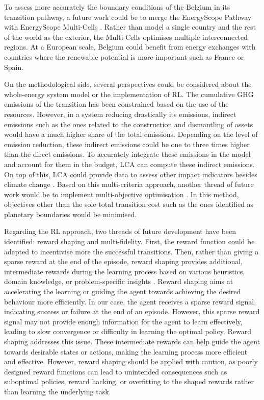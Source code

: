 To assess more accurately the boundary conditions of the Belgium in its transition pathway, a future work could be to merge the EnergyScope Pathway with EnergyScope Multi-Cells \cite{thiran2023validation}. Rather than model a single country and the rest of the world as the exterior, the Multi-Cells optimises multiple interconnected regions. At a European scale, Belgium could benefit from energy exchanges with countries where the renewable potential is more important such as France or Spain. 

On the methodological side, several perspectives could be considered about the whole-energy system model or the implementation of \gls{RL}. The cumulative \acrfull{GHG} emissions of the transition has been constrained based on the use of the resources. However, in a system reducing drastically its emissions, indirect emissions such as the ones related to the construction and dismantling of assets would have a much higher share of the total emissions. Depending on the level of emission reduction, these indirect emissions could be one to three times higher than the direct emissions. To accurately integrate these emissions in the model and account for them in the  budget, \gls{LCA} can compute these indirect emissions. On top of this, \gls{LCA} could provide data to assess other impact indicators besides climate change \cite{astudillo2018integrating}. Based on this multi-criteria approach, another thread of future work would be to implement multi-objective optimisation \cite{dubois2023multi}. In this method, objectives other than the sole total transition cost such as the ones identified as planetary boundaries \cite{richardson2023earth} would be minimised.

Regarding the \gls{RL} approach, two threads of future development have been identified: reward shaping and multi-fidelity.  First, the reward function could be adapted to incentivise more the successful transitions. Then, rather than giving a sparse reward at the end of the episode, reward shaping provides additional, intermediate rewards during the learning process based on various heuristics, domain knowledge, or problem-specific insights \cite{hu2020learning}. Reward shaping aims at accelerating the learning or guiding the agent towards achieving the desired behaviour more efficiently. In our case, the agent receives a sparse reward signal, indicating success or failure at the end of an episode. However, this sparse reward signal may not provide enough information for the agent to learn effectively, leading to slow convergence or difficulty in learning the optimal policy. Reward shaping addresses this issue. These intermediate rewards can help guide the agent towards desirable states or actions, making the learning process more efficient and effective. However, reward shaping should be applied with caution, as poorly designed reward functions can lead to unintended consequences such as suboptimal policies, reward hacking, or overfitting to the shaped rewards rather than learning the underlying task.  

